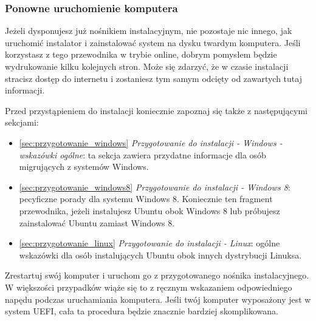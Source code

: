 \subsubsection{Ponowne uruchomienie komputera}
Jeżeli dysponujesz już  nośnikiem instalacyjnym, nie pozostaje nic innego, jak uruchomić instalator i zainstalować system na dysku twardym komputera. Jeśli korzystasz z tego przewodnika w trybie online, dobrym pomysłem będzie wydrukowanie kilku kolejnych stron. Może się zdarzyć, że w czasie instalacji stracisz dostęp do internetu i zostaniesz tym samym odcięty od zawartych tutaj informacji.

Przed przystąpieniem do instalacji koniecznie zapoznaj się także z następującymi sekcjami:
\begin{itemize}
\item \ref{sec:przygotowanie_windows} \textit{Przygotowanie do instalacji - Windows - wskazówki ogólne}: ta sekcja zawiera przydatne informacje dla osób migrujących z systemów Windows.
\item \ref{sec:przygotowanie_windows8} \textit{Przygotowanie do instalacji - Windows 8}: pecyficzne porady dla systemu Windows 8. Koniecznie ten fragment przewodnika, jeżeli instalujesz Ubuntu obok Windows 8 lub próbujesz zainstalować Ubuntu zamiast Windows 8.
\item \ref{sec:przygotowanie_linux} \textit{Przygotowanie do instalacji - Linux}: ogólne wskazówki dla osób instalujących Ubuntu obok innych dystrybucji Linuksa.
\end{itemize}
Zrestartuj swój komputer i uruchom go z przygotowanego nośnika instalacyjnego. W większości przypadków wiąże się to z ręcznym wskazaniem odpowiedniego napędu podczas uruchamiania komputera. Jeśli twój komputer wyposażony jest w system UEFI, cała ta procedura będzie znacznie bardziej skomplikowana.

